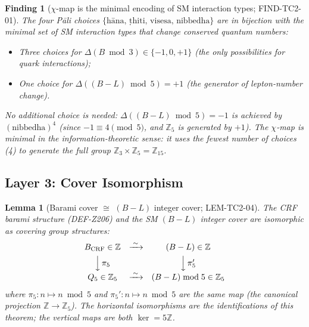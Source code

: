 \documentclass[12pt, a4paper]{article}
\newtheorem{lemma}{Lemma}[section]
\newtheorem{finding}{Finding}[section]
\begin{document}
\begin{finding}[$\chi$-map is the minimal encoding of SM interaction types;
  FIND-TC2-01]
The four Pāli choices $\{\text{hāna, ṭhiti, visesa, nibbedha}\}$
are in bijection with the \emph{minimal set of SM interaction types
that change conserved quantum numbers}:
\begin{itemize}[leftmargin=*, noitemsep]
  \item Three choices for $\Delta(B\bmod 3) \in \{-1, 0, +1\}$
    (the only possibilities for quark interactions);
  \item One choice for $\Delta((B-L)\bmod 5) = +1$ (the generator
    of lepton-number change).
\end{itemize}
No additional choice is needed: $\Delta((B-L)\bmod 5) = -1$ is
achieved by $(\text{nibbedha})^4$ (since $-1 \equiv 4 \pmod{5}$,
and $\mathbb{Z}_5$ is generated by $+1$). The $\chi$-map is
\emph{minimal} in the information-theoretic sense: it uses the
fewest number of choices (4) to generate the full group
$\mathbb{Z}_3 \times \mathbb{Z}_5 = \mathbb{Z}_{15}$.
\end{finding}

\subsection{Layer 3: Cover Isomorphism}
\label{sec:layer3}

\begin{lemma}[Barami cover $\cong$ $(B-L)$ integer cover; LEM-TC2-04]
\label{lem:cover-iso}
The CRF barami structure (DEF-Z206) and the SM $(B-L)$ integer cover
are isomorphic as covering group structures:
\begin{equation}
  \begin{array}{ccc}
    B_{\rm CRF} \in \mathbb{Z} & \xrightarrow{\;\sim\;} & (B-L) \in \mathbb{Z} \\[4pt]
    \Big\downarrow\,\pi_5 & & \Big\downarrow\,\pi_5' \\[4pt]
    Q_5 \in \mathbb{Z}_5 & \xrightarrow{\;\sim\;} & (B-L)\bmod 5 \in \mathbb{Z}_5
  \end{array}
  \label{eq:cover-diagram}
\end{equation}
where $\pi_5: n \mapsto n \bmod 5$ and $\pi_5': n \mapsto n \bmod 5$
are the same map (the canonical projection $\mathbb{Z} \to \mathbb{Z}_5$).
The horizontal isomorphisms are the identifications of this theorem;
the vertical maps are both $\ker = 5\mathbb{Z}$.
\end{lemma}
\end{document}
